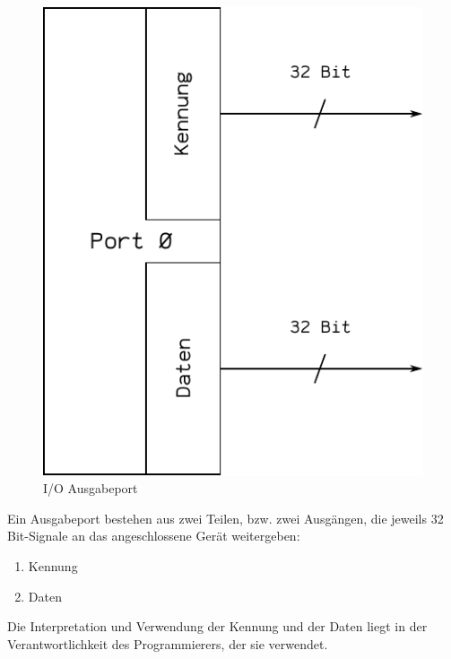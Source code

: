 \begin{figure}[htp]
 \centering
 \includegraphics{./img/UMach-IOPort.pdf}
 \caption{I/O Ausgabeport}
 \label{fig:IOPort}
\end{figure}


Ein Ausgabeport bestehen aus zwei Teilen, bzw. zwei Ausgängen, die jeweils 32
Bit-Signale an das angeschlossene Gerät weitergeben:
\begin{enumerate}
 \item Kennung
 \item Daten
\end{enumerate}

Die Interpretation und Verwendung der Kennung und der Daten liegt in der
Verantwortlichkeit des Programmierers, der sie verwendet.


